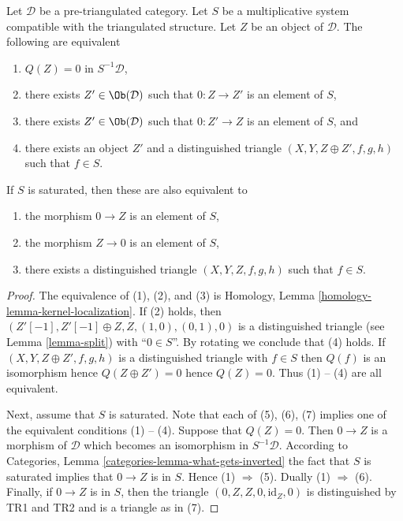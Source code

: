 \begin{lemma}
\label{lemma-kernel-localization}
Let $\mathcal{D}$ be a pre-triangulated category. Let $S$ be a multiplicative
system compatible with the triangulated structure. Let $Z$ be an object
of $\mathcal{D}$. The following are equivalent
\begin{enumerate}
\item $Q(Z) = 0$ in $S^{-1}\mathcal{D}$,
\item there exists $Z' \in \Ob(\mathcal{D})$ such that
$0 : Z \to Z'$ is an element of $S$,
\item there exists $Z' \in \Ob(\mathcal{D})$ such that
$0 : Z' \to Z$ is an element of $S$, and
\item there exists an object $Z'$ and a distinguished triangle
$(X, Y, Z \oplus Z', f, g, h)$ such that $f \in S$.
\end{enumerate}
If $S$ is saturated, then these are also equivalent to
\begin{enumerate}
\item[(5)] the morphism $0 \to Z$ is an element of $S$,
\item[(6)] the morphism $Z \to 0$ is an element of $S$,
\item[(7)] there exists a distinguished triangle $(X, Y, Z, f, g, h)$
such that $f \in S$.
\end{enumerate}
\end{lemma}

\begin{proof}
The equivalence of (1), (2), and (3) is
Homology, Lemma \ref{homology-lemma-kernel-localization}.
If (2) holds, then $(Z'[-1], Z'[-1] \oplus Z, Z, (1, 0), (0, 1), 0)$
is a distinguished triangle (see
Lemma \ref{lemma-split})
with ``$0 \in S$''. By rotating we conclude that (4) holds.
If $(X, Y, Z \oplus Z', f, g, h)$ is a distinguished triangle with $f \in S$
then $Q(f)$ is an isomorphism hence $Q(Z \oplus Z') = 0$ hence $Q(Z) = 0$.
Thus (1) -- (4) are all equivalent.

\medskip\noindent
Next, assume that $S$ is saturated. Note that each of (5), (6), (7)
implies one of the equivalent conditions (1) -- (4). Suppose that
$Q(Z) = 0$. Then $0 \to Z$ is a morphism of $\mathcal{D}$ which becomes
an isomorphism in $S^{-1}\mathcal{D}$. According to
Categories, Lemma \ref{categories-lemma-what-gets-inverted}
the fact that $S$ is saturated implies that $0 \to Z$ is in $S$.
Hence (1) $\Rightarrow$ (5). Dually (1) $\Rightarrow$ (6).
Finally, if $0 \to Z$ is in $S$, then the triangle
$(0, Z, Z, 0, \text{id}_Z, 0)$ is distinguished by TR1 and TR2 and
is a triangle as in (7).
\end{proof}

